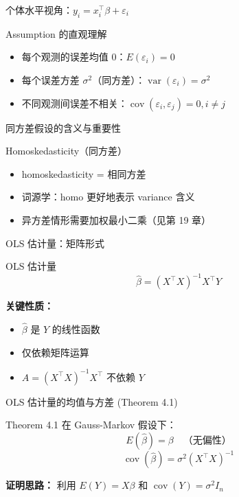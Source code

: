 \documentclass[]{beamer}
\DeclareMathOperator{\cov}{cov}
\DeclareMathOperator{\var}{var}
\begin{document}
\begin{frame}{个体水平视角：$y_i = x_i^\top \beta + \varepsilon_i$}
\begin{block}{Assumption 的直观理解}
\begin{itemize}
  \item 每个观测的误差均值 0：$E(\varepsilon_i) = 0$
  \item 每个误差方差 $\sigma^2$（同方差）：$\var(\varepsilon_i) = \sigma^2$
  \item 不同观测间误差不相关：$\cov(\varepsilon_i, \varepsilon_j) = 0, i \neq j$
\end{itemize}
\end{block}
\end{frame}

\begin{frame}{同方差假设的含义与重要性}
\begin{alertblock}{Homoskedasticity（同方差）}
\begin{itemize}
  \item homoskedasticity = 相同方差
  \item 词源学：homo 更好地表示 variance 含义
  \item 异方差情形需要加权最小二乘（见第 19 章）
\end{itemize}
\end{alertblock}
\end{frame}

\begin{frame}{OLS 估计量：矩阵形式}
\begin{block}{OLS 估计量}
\[
\hat{\beta} = (X^\top X)^{-1} X^\top Y
\]
\end{block}
\vspace{1em}
\textbf{关键性质：}
\begin{itemize}
  \item $\hat{\beta}$ 是 $Y$ 的线性函数
  \item 仅依赖矩阵运算
  \item $A = (X^\top X)^{-1} X^\top$ 不依赖 $Y$
\end{itemize}
\end{frame}

\begin{frame}{OLS 估计量的均值与方差 (Theorem 4.1)}
\begin{block}{Theorem 4.1}
在 Gauss-Markov 假设下：
\[
E(\hat{\beta}) = \beta \quad \text{（无偏性）}
\]
\[
\cov(\hat{\beta}) = \sigma^2 (X^\top X)^{-1}
\]
\end{block}
\vspace{0.5em}
\textbf{证明思路：} 利用 $E(Y) = X\beta$ 和 $\cov(Y) = \sigma^2 I_n$
\end{frame}
\end{document}
